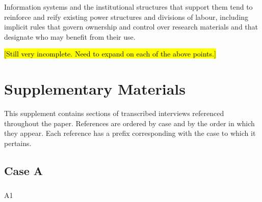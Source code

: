 \documentclass[
  canadian,
]{article}
\makeatletter
\let\oldsubparagraph\subparagraph
\renewcommand{\subparagraph}{
    \@ifstar
      \xxxSubParagraphStar
      \xxxSubParagraphNoStar
  }
\newcommand{\xxxSubParagraphStar}[1]{\oldsubparagraph*{#1}\mbox{}}
\newcommand{\xxxSubParagraphNoStar}[1]{\oldsubparagraph{#1}\mbox{}}
\makeatother
\begin{document}
Information systems and the institutional structures that support them
tend to reinforce and reify existing power structures and divisions of
labour, including implicit rules that govern ownership and control over
research materials and that designate who may benefit from their use.

\hl{{[}Still very incomplete. Need to expand on each of the above
points.{]}}

\section{Supplementary Materials}\label{supplementary-materials}

This supplement contains sections of transcribed interviews referenced
throughout the paper. References are ordered by case and by the order in
which they appear. Each reference has a prefix corresponding with the
case to which it pertains.

\subsection{Case A}\label{case-a}

\subparagraph{A1}\label{sec-A1}
\end{document}
